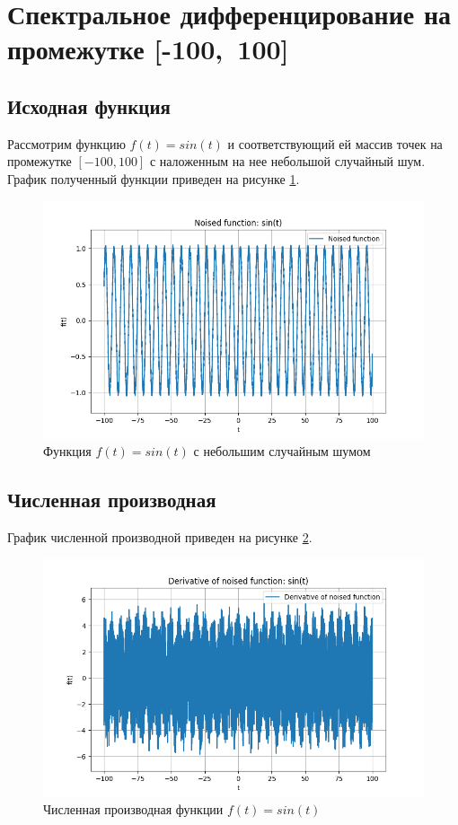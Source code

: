 \section{Спектральное дифференцирование на промежутке \mbox{[-100, 100]}}\label{app:A}

\subsection{Исходная функция}
Рассмотрим функцию $f(t) = sin(t)$ и соответствующий ей массив точек на промежутке $[-100, 100]$ с 
наложенным на нее небольшой случайный шум. График полученный функции приведен на рисунке \ref{fig:noised_sin_100}.

\begin{figure}[ht!]
    \centering
    \includegraphics[width=\textwidth]{../results/100/noised_sin.png}
    \caption{Функция $f(t) = sin(t)$ с небольшим случайным шумом}
    \label{fig:noised_sin_100}
\end{figure}

\FloatBarrier
\subsection{Численная производная}
График численной производной приведен на рисунке \ref{fig:diff_noised_sin_100}.

\begin{figure}[ht!]
    \centering
    \includegraphics[width=\textwidth]{../results/100/noised_sin_derivative.png}
    \caption{Численная производная функции $f(t) = sin(t)$}
    \label{fig:diff_noised_sin_100}
\end{figure}

